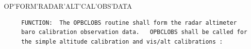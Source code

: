 \begin{frame}
OP'FORM'RADAR'ALT'CAL'OBS'DATA
\begin{verbatim}
     FUNCTION:  The OPBCLOBS routine shall form the radar altimeter
     baro calibration observation data.   OPBCLOBS shall be called for
     the simple altitude calibration and vis/alt calibrations :

\end{verbatim}
\end{frame}
